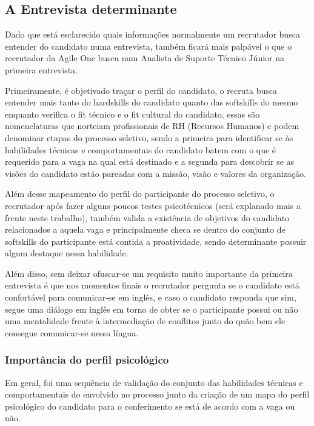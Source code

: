 \documentclass[12pt]{article}
\begin{document}
\newpage

\subsection{A Entrevista determinante}

Dado que está esclarecido quais informações normalmente um recrutador busca entender do candidato numa entrevista, também ficará mais palpável o que o recrutador da Agile One busca num Analista de Suporte Técnico Júnior na primeira entrevista.

Primeiramente, é objetivado traçar o perfil do candidato, o recruta busca entender mais tanto do hardskills do candidato quanto das softskills do mesmo enquanto verifica o fit técnico e o fit cultural do candidato, essas são nomenclaturas que norteiam profissionais de RH (Recursos Humanos) e podem denominar etapas do processo seletivo, sendo a primeira para identificar se às habilidades técnicas e comportamentais do candidato batem com o que é requerido para a vaga na qual está destinado e a segunda para descobrir se as visões do candidato estão pareadas com a missão, visão e valores da organização.

Além desse mapeamento do perfil do participante do processo seletivo, o recrutador após fazer alguns poucos testes psicotécnicos (será explanado mais a frente neste trabalho), também valida a existência de objetivos do candidato relacionados a aquela vaga e principalmente checa se dentro do conjunto de softskills do participante está contida a proatividade, sendo determinante possuir algum destaque nessa habilidade.

Além disso, sem deixar ofuscar-se um requisito muito importante da primeira entrevista é que nos momentos finais o recrutador pergunta se o candidato está confortável para comunicar-se em inglês, e caso o candidato responda que sim, segue uma diálogo em inglês em torno de obter se o participante possui ou não uma mentalidade frente à intermediação de conflitos junto do quão bem ele consegue comunicar-se nessa língua. 

\subsubsection{Importância do perfil psicológico}
Em geral, foi uma sequência de validação do conjunto das habilidades técnicas e comportamentais do envolvido no processo junto da criação de um mapa do perfil psicológico do candidato para o conferimento se está de acordo com a vaga ou não.
\end{document}
